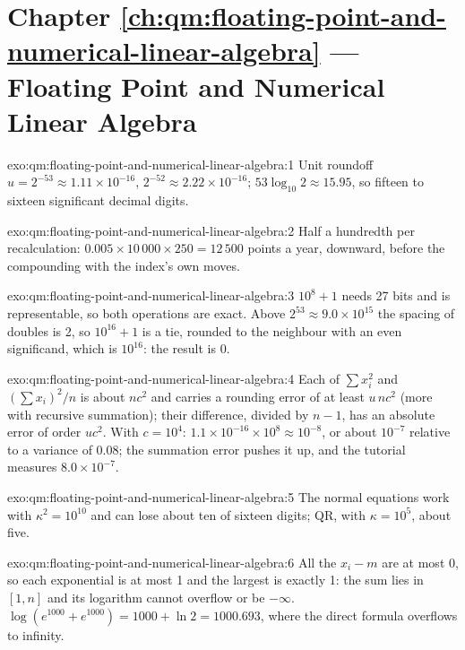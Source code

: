 \section*{Chapter \ref{ch:qm:floating-point-and-numerical-linear-algebra} --- Floating Point and Numerical Linear Algebra}

\begin{solution}{exo:qm:floating-point-and-numerical-linear-algebra:1}
Unit roundoff $u = 2^{-53} \approx 1.11 \times 10^{-16}$,  $2^{-52} \approx 2.22 \times 10^{-16}$; $53\log_{10}2 \approx 15.95$, so fifteen to sixteen significant decimal digits.
\end{solution}

\begin{solution}{exo:qm:floating-point-and-numerical-linear-algebra:2}
Half a hundredth per recalculation: $0.005 \times 10\,000 \times 250 = 12\,500$ points a year, downward, before the compounding with the index's own moves.
\end{solution}

\begin{solution}{exo:qm:floating-point-and-numerical-linear-algebra:3}
$10^8 + 1$ needs 27 bits and is representable, so both operations are exact. Above $2^{53} \approx 9.0 \times 10^{15}$ the spacing of doubles is 2, so $10^{16} + 1$ is a tie, rounded to the
neighbour with an even significand, which is $10^{16}$: the result is 0.
\end{solution}

\begin{solution}{exo:qm:floating-point-and-numerical-linear-algebra:4}
Each of $\sum x_i^2$ and $(\sum x_i)^2/n$ is about $nc^2$ and carries a rounding error of at least $u\,nc^2$ (more with recursive summation); their difference, divided by $n - 1$, has an absolute
error of order $uc^2$. With $c = 10^4$: $1.1 \times 10^{-16} \times 10^8 \approx 10^{-8}$, or about $10^{-7}$ relative to a variance of 0.08; the summation error pushes it up, and the tutorial
measures $8.0 \times 10^{-7}$.
\end{solution}

\begin{solution}{exo:qm:floating-point-and-numerical-linear-algebra:5}
The normal equations work with $\kappa^2 = 10^{10}$ and can lose about ten of sixteen digits; QR, with $\kappa = 10^5$, about five.
\end{solution}

\begin{solution}{exo:qm:floating-point-and-numerical-linear-algebra:6}
All the $x_i - m$ are at most 0, so each exponential is at most 1 and the largest is exactly 1: the sum lies in $[1, n]$ and its logarithm cannot overflow or be $-\infty$. $\log(e^{1000} + e^{1000}) =
1000 + \ln2 = 1000.693$, where the direct formula overflows to infinity.
\end{solution}

